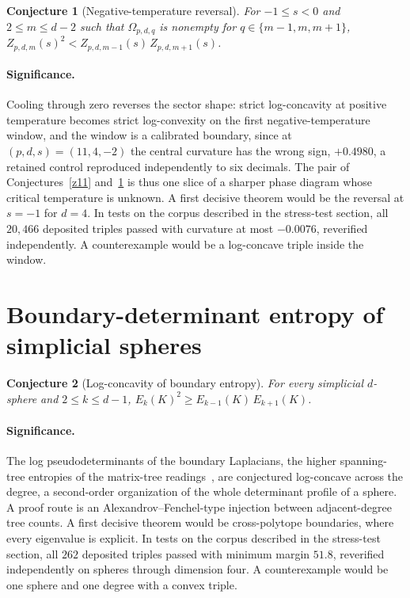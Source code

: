 \documentclass[11pt]{article}
\newtheorem{conjecture}{Conjecture}
\theoremstyle{definition}
\begin{document}
\begin{conjecture}[Negative-temperature reversal]\label{z15}
For $-1\le s<0$ and $2\le m\le d-2$ such that $\Omega_{p,d,q}$ is nonempty for $q\in\{m-1,m,m+1\}$, $Z_{p,d,m}(s)^2<Z_{p,d,m-1}(s)\,Z_{p,d,m+1}(s)$.
\end{conjecture}

\paragraph{Significance.}
Cooling through zero reverses the sector shape: strict log-concavity at positive temperature becomes strict log-convexity on the first negative-temperature window, and the window is a calibrated boundary, since at $(p,d,s)=(11,4,-2)$ the central curvature has the wrong sign, $+0.4980$, a retained control reproduced independently to six decimals.  The pair of Conjectures~\ref{z11} and~\ref{z15} is thus one slice of a sharper phase diagram whose critical temperature is unknown.  A first decisive theorem would be the reversal at $s=-1$ for $d=4$.  In tests on the corpus described in the stress-test section, all $20{,}466$ deposited triples passed with curvature at most $-0.0076$, reverified independently.  A counterexample would be a log-concave triple inside the window.

\section{Boundary-determinant entropy of simplicial spheres}

\begin{conjecture}[Log-concavity of boundary entropy]\label{z16}
For every simplicial $d$-sphere and $2\le k\le d-1$, $E_k(K)^2\ge E_{k-1}(K)\,E_{k+1}(K)$.
\end{conjecture}

\paragraph{Significance.}
The log pseudodeterminants of the boundary Laplacians, the higher spanning-tree entropies of the matrix-tree readings~\cite{DKM09,MMRW15}, are conjectured log-concave across the degree, a second-order organization of the whole determinant profile of a sphere.  A proof route is an Alexandrov--Fenchel-type injection between adjacent-degree tree counts.  A first decisive theorem would be cross-polytope boundaries, where every eigenvalue is explicit.  In tests on the corpus described in the stress-test section, all $262$ deposited triples passed with minimum margin $51.8$, reverified independently on spheres through dimension four.  A counterexample would be one sphere and one degree with a convex triple.
\end{document}
